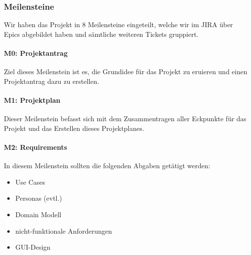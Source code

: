 \documentclass[a4paper]{article}
\begin{document}
\subsubsection{Meilensteine}

Wir haben das Projekt in 8 Meilensteine eingeteilt, welche wir im JIRA über Epics abgebildet haben und sämtliche weiteren Tickets gruppiert.

\paragraph{M0: Projektantrag} 

Ziel dieses Meilenstein ist es, die Grundidee für das Projekt zu eruieren und einen Projektantrag dazu zu erstellen.

\paragraph{M1: Projektplan} 

Dieser Meilenstein befasst sich mit dem Zusammentragen aller Eckpunkte für das Projekt und das Erstellen dieses Projektplanes.

\paragraph{M2: Requirements} 


In diesem Meilenstein sollten die folgenden Abgaben getätigt werden:

\begin{itemize}
  \item Use Cases
  \item Personas (evtl.)
  \item Domain Modell
  \item nicht-funktionale Anforderungen
  \item GUI-Design
\end{itemize}
\end{document}
